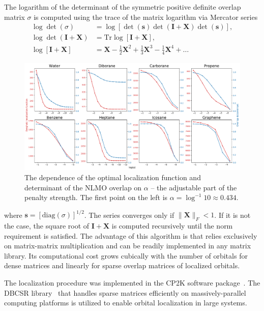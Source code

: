 \documentclass[aps,prl,reprint,amsmath,amssymb]{revtex4-1}
\begin{document}
The logarithm of the determinant of the symmetric positive definite overlap matrix $\sigma$ is computed using the trace of the matrix logarithm via Mercator series
%
\begin{equation} \label{eq:mercator}
\begin{split}
\log \det \left( \sigma \right) &= \log \left[ \det(\mathbf{s}) \det(\mathbf{I} + \mathbf{X}) \det(\mathbf{s}) \right], \\
\log \det \left( \mathbf{I} + \mathbf{X} \right) &= \text{Tr} \log \left[ \mathbf{I} + \mathbf{X} \right], \\
\log \left[ \mathbf{I} + \mathbf{X} \right] &= \mathbf{X} - \frac{1}{2}\mathbf{X}^2  + \frac{1}{3}\mathbf{X}^3 - \frac{1}{4}\mathbf{X}^4 + \ldots
\end{split}
\end{equation}
%
%
\begin{figure}[hbpt]
\centering
\includegraphics[width=\textwidth]{trend.pdf}
\caption{The dependence of the optimal localization function and determinant of the NLMO overlap on $\alpha$ -- the adjustable part of the penalty strength. The first point on the left is $\alpha = \log^{-1} 10 \approx 0.434$.}
\label{fig:alpha}
\end{figure}
%
where $\mathbf{s}=\left[\text{diag}(\sigma)\right]^{1/2}$. The series converges only if $\|\mathbf{X}\|_F < 1$. If it is not the case, the square root of $\mathbf{I}+\mathbf{X}$ is computed recursively until the norm requirement is satisfied. The advantage of this algorithm is that relies exclusively on matrix-matrix multiplication and can be readily implemented in any matrix library. Its computational cost grows cubically with the number of orbitals for dense matrices and linearly for sparse overlap matrices of localized orbitals.

The localization procedure was implemented in the CP2K software package~\cite{cp2kgeneral}. The DBCSR library~\cite{borvstnik2014sparse} that handles sparse matrices efficiently on massively-parallel computing platforms is utilized to enable orbital localization in large systems.
\end{document}
